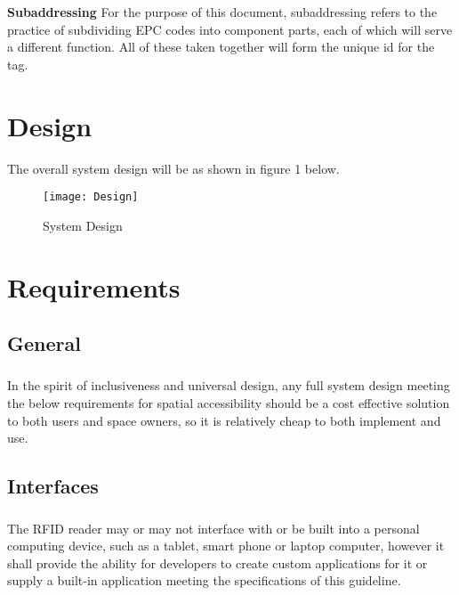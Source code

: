 \documentclass{article}
\begin{document}
\textbf{Subaddressing}
\newline
For the purpose of this document, subaddressing refers to the practice of subdividing EPC codes into component parts, each of which will serve a different function. All of these taken together will form the unique id for the tag. \medskip

\newpage

\section{Design}

The overall system design will be as shown in figure 1 below. \medskip

\begin{figure}[h]
    \texttt{[image: Design]}
    \caption{System Design}
    \label{fig:figure1}
\end{figure}

\section{Requirements}

\subsection{General}

\subsubsection{} In the spirit of inclusiveness and universal design, any full system design meeting the below requirements for spatial accessibility should be a cost effective solution to both users and space owners, so it is relatively cheap to both implement and use.

\subsection{Interfaces}

\subsubsection{} The RFID reader may or may not interface with or be built into a personal computing device, such as a tablet, smart phone or laptop computer, however it shall provide the ability for developers to create custom applications for it or supply a built-in application meeting the specifications of this guideline.
\end{document}
